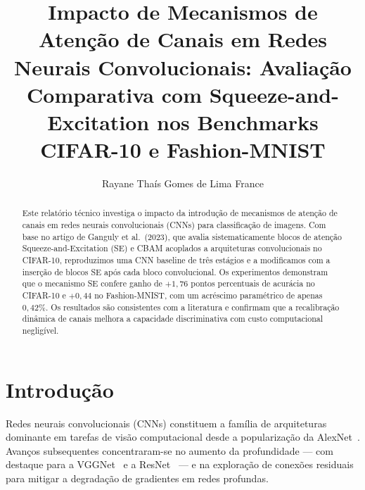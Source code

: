 \documentclass[runningheads]{llncs}
\begin{document}
\title{Impacto de Mecanismos de Atenção de Canais em
Redes Neurais Convolucionais: Avaliação Comparativa
com Squeeze-and-Excitation nos Benchmarks CIFAR-10 e Fashion-MNIST}

\author{Rayane Thaís Gomes de Lima France}



\maketitle

\begin{abstract}
Este relatório técnico investiga o impacto da introdução de mecanismos
de atenção de canais em redes neurais convolucionais (CNNs) para
classificação de imagens. Com base no artigo de Ganguly et al.\ (2023),
que avalia sistematicamente blocos de atenção Squeeze-and-Excitation (SE)
e CBAM acoplados a arquiteturas convolucionais no CIFAR-10, reproduzimos
uma CNN baseline de três estágios e a modificamos com a inserção de
blocos SE após cada bloco convolucional. Os experimentos demonstram que
o mecanismo SE confere ganho de $+1{,}76$ pontos percentuais de acurácia
no CIFAR-10 e $+0{,}44$ no Fashion-MNIST, com um acréscimo paramétrico
de apenas $0{,}42\%$. Os resultados são consistentes com a literatura e
confirmam que a recalibração dinâmica de canais melhora a capacidade
discriminativa com custo computacional negligível.

\end{abstract}

\section{Introdução}

Redes neurais convolucionais (CNNs) constituem a família de arquiteturas
dominante em tarefas de visão computacional desde a popularização da
AlexNet~\cite{ref_alexnet}. Avanços subsequentes concentraram-se no
aumento da profundidade --- com destaque para a VGGNet~\cite{ref_vgg} e
a ResNet~\cite{ref_resnet} --- e na exploração de conexões residuais
para mitigar a degradação de gradientes em redes profundas.
\end{document}
